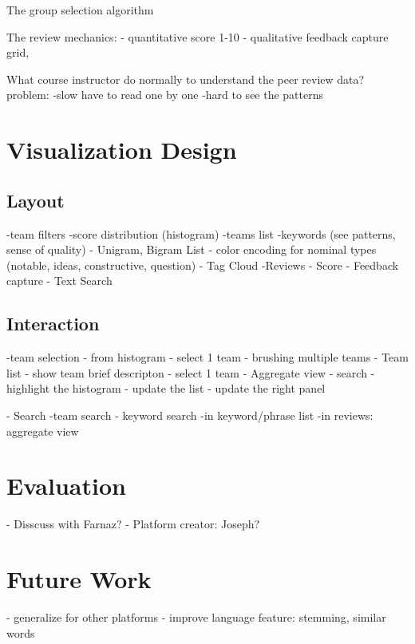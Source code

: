 \documentclass{sigchi}
\begin{document}
The group selection algorithm

The review mechanics: 
- quantitative score 1-10
- qualitative feedback capture grid,

What course instructor do normally to understand the peer review data?
  problem: 
    -slow have to read one by one 
    -hard to see the patterns


\section{Visualization Design}

\subsection{Layout}
-team filters 
-score distribution (histogram)
-teams list
-keywords (see patterns, sense of quality)
  - Unigram, Bigram List
    - color encoding for nominal types (notable, ideas, constructive, question)
  - Tag Cloud
-Reviews
  - Score
  - Feedback capture
  - Text Search


\subsection{Interaction}

-team selection
  - from histogram
    - select 1 team
    - brushing multiple teams
  - Team list
    - show team brief descripton
    - select 1 team
  - Aggregate view
  - search 
    - highlight the histogram
    - update the list
    - update the right panel 

- Search
  -team search
  - keyword search
    -in keyword/phrase list
    -in reviews: aggregate view



\section{Evaluation}
- Disscuss with Farnaz?
- Platform creator: Joseph?

\section{Future Work}
- generalize for other platforms
- improve language feature: stemming, similar words
\end{document}
